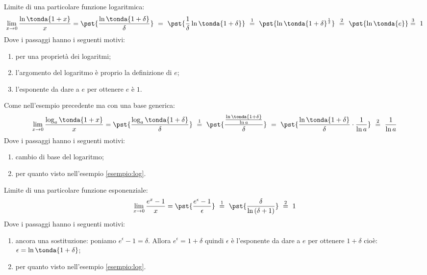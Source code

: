 \begin{esempio}
\label{esempio:log}
Limite di una particolare funzione logaritmica:
\[
 \lim_{x \rightarrow 0} \dfrac{\ln\tonda{1+x}}{x} =
 \pst{\dfrac{\ln\tonda{1+\delta}}{\delta}}~ = ~  
 \pst{\frac{1}{\delta}\ln\tonda{1+\delta}} ~\stackrel{1}{=} ~
 \pst{\ln\tonda{1+\delta}^\frac{1}{\delta}}
~ \stackrel{2}{=} ~
\pst{\ln\tonda{e}} \stackrel{3}{=} ~ 1
\]
Dove i passaggi hanno i seguenti motivi:
\begin{enumerate} [nosep]
 \item per una proprietà dei logaritmi;
 \item l'argomento del logaritmo è proprio la definizione di \(e\);
 \item l'esponente da dare a \(e\) per ottenere \(e\) è \(1\).
\end{enumerate}
\end{esempio}

\begin{esempio}
Come nell'esempio precedente ma con una base generica:
\[
 \lim_{x \rightarrow 0} \dfrac{\log_a\tonda{1+x}}{x} =
 \pst{\dfrac{\log_a\tonda{1+\delta}}{\delta}}~\stackrel{1}{=} ~  
 \pst{\dfrac{\frac{\ln\tonda{1+\delta}}{\ln a}}{\delta}}~= ~
 \pst{\dfrac{\ln\tonda{1+\delta}}{\delta}\cdot \dfrac{1}{\ln a}}
 ~ \stackrel{2}{=} ~
 \dfrac{1}{\ln a}
\]
Dove i passaggi hanno i seguenti motivi:
\begin{enumerate} [nosep]
 \item cambio di base del logaritmo;
 \item per quanto visto nell'esempio \ref{esempio:log}.
\end{enumerate}
\end{esempio}

\begin{esempio}
Limite di una particolare funzione esponenziale:
\[
\lim_{x \rightarrow 0} \dfrac{e^x-1}{x} =
\pst{\dfrac{e^\epsilon-1}{\epsilon}}
~ \stackrel{1}{=} ~  
\pst{\dfrac{\delta}{\ln{(\delta+1)}}}~ \stackrel{2}{=} ~ 1
\]
Dove i passaggi hanno i seguenti motivi:
\begin{enumerate} [nosep]
 \item ancora una sostituzione: poniamo \(e^\epsilon-1=\delta\). 
Allora \(e^\epsilon = 1+\delta\) quindi \(\epsilon\) è l'esponente da dare 
a \(e\) per ottenere \(1+\delta\) cioè: 
\(\epsilon = \ln{\tonda{1+\delta}}\);
 \item per quanto visto nell'esempio \ref{esempio:log}.
\end{enumerate}
\end{esempio}

